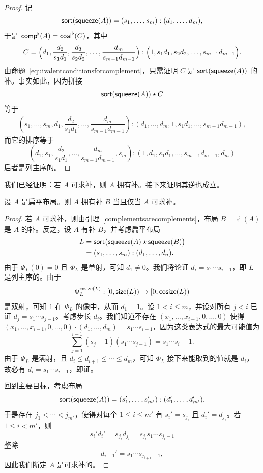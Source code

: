 \begin{proof}
    记
    \[\mathsf{sort}(\mathsf{squeeze}(A)) = (s_1,\dots,s_m):(d_1,\dots,d_m),\]
    于是 $\mathsf{comp}^\flat(A) = \mathsf{coal}^\flat(C)$，其中
    \[C = \Bigl(d_1 , \dfrac{d_2}{s_1d_1} , \dfrac{d_3}{s_2d_2} , \dots ,\dfrac{d_m}{s_{m-1}d_{m-1}} \Bigr) : \Bigl(1 , s_1d_1 , s_2d_2, \dots ,s_{m-1}d_{m-1}\Bigr).
    \]
    由命题~\ref{equivalentconditionsforcomplement}，只需证明 $C$ 是 $\mathsf{sort}(\mathsf{squeeze}(A))$ 的补。事实如此，因为拼接
    \[
    \mathsf{sort}(\mathsf{squeeze}(A)) \star C
    \]
    等于
    \begin{align*}
    \left(s_1,\dots,s_m,d_1,\dfrac{d_2}{s_1d_1},\dots,\dfrac{d_m}{s_{m-1}d_{m-1}}\right):(d_1,\dots,d_m,1,s_1d_1,\dots, s_{m-1}d_{m-1}),
    \end{align*}
    而它的排序等于
    \[
    \left(d_1,s_1, \dfrac{d_2}{s_1d_1},\dots, \dfrac{d_m}{s_{m-1}{d_{m-1}}}, s_m \right):(1,d_1,s_1d_1, \dots ,s_{m-1}d_{m-1}, d_m)
    \]
    后者是列主序的。
\end{proof}

我们已经证明：若 $A$ 可求补，则 $A$ 拥有补。接下来证明其逆也成立。

\begin{proposition}\label{complementableproposition}
    设 $A$ 是扁平布局。则 $A$ 拥有补 $B$ 当且仅当 $A$ 可求补。
\end{proposition}

\begin{proof}
    若 $A$ 可求补，则由引理~\ref{complementsarecomplements}，布局 $B = \comp^\flat(A)$ 是 $A$ 的补。反之，设 $A$ 有补 $B$，并考虑扁平布局
    \begin{align*} L & = \mathsf{sort}\bigl(\mathsf{squeeze}(A)\star \mathsf{squeeze}(B)\bigr) \\
    & = (s_1,\dots,s_m):(d_1,\dots,d_n).
    \end{align*}
    由于 $\Phi_L(0) = 0$ 且 $\Phi_L$ 是单射，可知 $d_1 \neq 0$。我们将论证 $d_i = s_1 \cdots s_{i-1}$，即 $L$ 是列主序的。由于
    \[\Phi_L^{\mathsf{cosize}(L)} : [0,\mathsf{size}(L)) \to [0,\mathsf{cosize}(L))
    \]
    是双射，可知 $1$ 在 $\Phi_L$ 的像中，从而 $d_1 = 1$。设 $1 < i \leq m$，并设对所有 $j < i$ 已证 $d_j = s_1 \cdots s_{j-1}$。考虑步长 $d_{i}$。我们知道不存在 $(x_1,\dots,x_{i-1},0,\dots,0)$ 使得 $(x_1,\dots,x_{i-1},0,\dots,0) \cdot (d_1,\dots,d_m) = s_1\cdots s_{i-1}$，因为这类表达式的最大可能值为
    \[
    \sum_{j = 1}^{i-1} (s_j-1)(s_1\cdots s_{j-1}) = s_1 \cdots s_i - 1.
    \]
    由于 $\Phi_L$ 是满射，且 $d_i \leq  d_{i+1} \leq  \cdots \leq  d_m$，可知 $\Phi_L$ 接下来能取到的值就是 $d_i$，故必有 $d_i = s_1\cdots s_{i-1}$，即证。

    回到主要目标，考虑布局
    \[\mathsf{sort}(\mathsf{squeeze}(A)) = (s_1',\dots,s_{m'}'):(d_1',\dots,d_{m'}').\] 于是存在 $j_1 < \cdots < j_{m'}$，使得对每个 $1 \leq i \leq m'$ 有 $s_i' = s_{j_i}$ 且 $d_i' = d_{j_i}$。若 $1 \leq i < m'$，则
    \[
    s_i'd_i' = s_{j_i}d_{j_i} = s_{j_i} s_1 \cdots s_{j_i - 1}
    \]
    整除
    \[
    d_{i+1}' = s_1 \cdots s_{j_{i+1}-1},
    \]
    因此我们断定 $A$ 是可求补的。
\end{proof}


